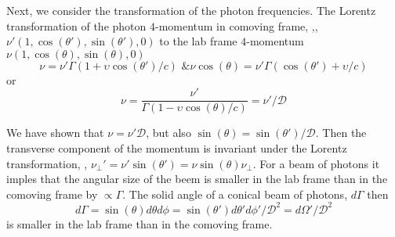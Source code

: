 Next, we consider the transformation of the photon frequencies. 
%
The Lorentz transformation of the photon $4$-momentum in comoving frame, \eg,, 
$\nu'(1, \cos(\theta'), \sin(\theta'),0)$ to the lab frame $4$-momentum 
$\nu(1, \cos(\theta), \sin(\theta), 0)$
%
\begin{equation}
\nu = \nu' \Gamma(1+\upsilon \cos(\theta')/c) \text{ \& } \nu\cos(\theta) = \nu' \Gamma (\cos(\theta') + \upsilon/c)
\end{equation}
%
or 
%
\begin{equation}
\nu = \frac{\nu'}{\Gamma (1 - \upsilon\cos(\theta)/c)} = \nu' / \mathcal{D}
\label{eq:afterglow:dop_fac_freq}
\end{equation}
%




We have shown that $\nu = \nu' \mathcal{D}$, but also 
$\sin(\theta) = \sin(\theta')/\mathcal{D}$. Then the transverse component of the 
momentum is invariant under the Lorentz transformation, \eg, 
$\nu_{\perp}' = \nu'\sin(\theta') = \nu\sin(\theta) \nu_{\perp}$. 
For a beam of photons it imples that the angular size of the beem is smaller 
in the lab frame than in the comoving frame by $\propto \Gamma$.
%
The solid angle of a conical beam of photons, $d\Gamma$ then 
%
\begin{equation}
d\Gamma = \sin(\theta)d\theta d\phi = \sin(\theta') d\theta' d\phi' / \mathcal{D}^2 = d\Omega'/\mathcal{D}^2
\end{equation}
%
is smaller in the lab frame than in the comoving frame.
%



